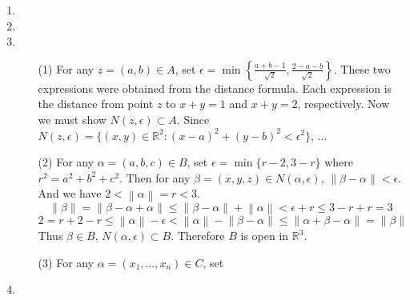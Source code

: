 \documentclass[12pt]{report}
\newcommand{\numl}[1]{\item[\large\textbf{\sffamily #1.}]}
\newcommand{\bb}[1]{\mathbb{#1}}
\newcommand{\norm}[1]{\left\lVert#1\right\rVert}
\newcommand{\ds}{\displaystyle}
\begin{document}
\begin{enumerate}
\begin{enumerate}
	(0.2) 
\end{enumerate}
\numl{5}

\numl{6}

\numl{7}
\begin{enumerate}
	\item[(1)] For any $z = (a, b)\in A$, set $\epsilon = \min\left\{\ds \frac{a+b-1}{\sqrt{2}}, \frac{2-a-b}{\sqrt{2}} \right\}$. These two expressions were obtained from the distance formula. Each expression is the distance from point $z$ to $x+y=1$ and $x+y=2$, respectively. Now we must show $N(z, \epsilon) \subset A$. Since $N(z, \epsilon) = \{(x, y)\in \bb{R}^2: (x - a)^2 + (y - b)^2 < \epsilon^2 \}$, ...
	\item[(2)] For any $\alpha = (a, b, c)\in B$, set $\epsilon = \min\{r-2, 3-r \}$ where $r^2 = a^2+b^2+c^2$. Then for any $\beta = (x, y, z) \in N(\alpha, \epsilon)$, $\norm{\beta - \alpha} < \epsilon$. And we have $2 < \norm{\alpha} = r <3 $. $$\norm{\beta} = \norm{\beta - \alpha + \alpha}\leq \norm{\beta - \alpha} +\norm{\alpha} < \epsilon + r \leq 3-r + r = 3$$
	$$2 = r + 2-r \leq \norm{\alpha} - \epsilon < \norm{\alpha} -\norm{\beta-\alpha} \leq \norm{\alpha + \beta - \alpha} = \norm{\beta}$$ 
	Thus $\beta \in B$, $N(\alpha, \epsilon) \subset B$. Therefore $B$ is open in $\bb{R}^3$.
	\item[(3)] For any $\alpha = (x_1, \dots, x_n) \in C$, set 
\end{enumerate}

\numl{8}


\end{enumerate}
\end{document}
